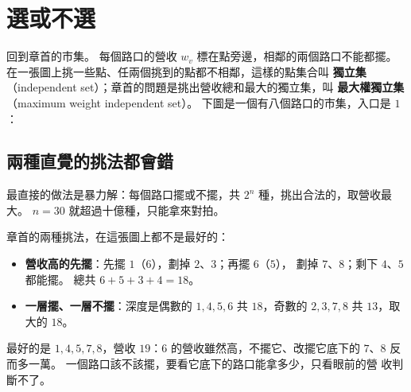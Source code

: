 \section{選或不選}
\label{sec:tdp-mis}

回到章首的市集。 每個路口的營收 $w_v$ 標在點旁邊，相鄰的兩個路口不能都擺。 在一張圖上挑一些點、任兩個挑到的點都不相鄰，這樣的點集合叫
\textbf{獨立集}（independent set）；章首的問題是挑出營收總和最大的獨立集，叫
\textbf{最大權獨立集}（maximum weight independent set）。 下圖是一個有八個路口的市集，入口是 $1$：

\begin{center}
\label{fig:tdp-mis}
\end{center}

\subsection{兩種直覺的挑法都會錯}

最直接的做法是暴力解：每個路口擺或不擺，共 $2^n$ 種，挑出合法的，取營收最大。
$n = 30$ 就超過十億種，只能拿來對拍。

章首的兩種挑法，在這張圖上都不是最好的：

\begin{itemize}
\item \textbf{營收高的先擺}：先擺 $1$（$6$），劃掉 $2$、$3$；再擺 $6$（$5$），
劃掉 $7$、$8$；剩下 $4$、$5$ 都能擺。 總共 $6 + 5 + 3 + 4 = 18$。
\item \textbf{一層擺、一層不擺}：深度是偶數的 $1, 4, 5, 6$ 共 $18$，奇數的
$2, 3, 7, 8$ 共 $13$，取大的 $18$。
\end{itemize}

最好的是 $1, 4, 5, 7, 8$，營收 $19$：$6$ 的營收雖然高，不擺它、改擺它底下的
$7$、$8$ 反而多一萬。 一個路口該不該擺，要看它底下的路口能拿多少，只看眼前的營
收判斷不了。

